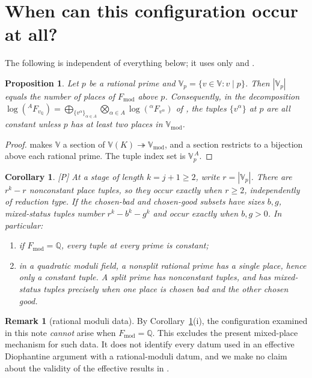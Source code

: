 \documentclass[11pt]{article}
\theoremstyle{plain}
\newtheorem{proposition}[theorem]{Proposition}
\newtheorem{corollary}[theorem]{Corollary}
\theoremstyle{definition}
\newtheorem{remark}{Remark}
\newcommand{\Fmod}{F_{\mathrm{mod}}}
\newcommand{\Vmod}{\mathbb{V}_{\mathrm{mod}}}
\newcommand{\VV}{\mathbb{V}}
\begin{document}
\section{When can this configuration occur at all?}\label{s:dich}

The following is independent of everything below; it uses only
\cite[Def.~3.1(e)]{IUT1} and \cite[Prop.~3.1]{IUT3}.

\begin{proposition}\label{p:dich}
Let $p$ be a rational prime and $\VV_p=\{v\in\VV: v\mid p\}$.  Then $|\VV_p|$
equals the number of places of $\Fmod$ above $p$.  Consequently, in the
decomposition
$\log({}^AF_{v_{\mathbb{Q}}})=\bigoplus_{\{v^\alpha\}_{\alpha\in A}}
\bigotimes_{\alpha\in A}\log({}^\alpha F_{v^\alpha})$ of \cite[Prop.~3.1]{IUT3},
the tuples $\{v^\alpha\}$ at $p$ are all constant unless $p$ has at least two
places in $\Vmod$.
\end{proposition}

\begin{proof}
\cite[Def.~3.1(e)]{IUT1} makes $\VV$ a section of
$\VV(K)\twoheadrightarrow\Vmod$, and a section restricts to a bijection above
each rational prime.  The tuple index set is $\VV_p^{\,A}$.
\end{proof}

\begin{corollary}\label{c:dich}
\textup{[P]} At a stage of length $k=j+1\ge2$, write $r=|\VV_p|$.
There are $r^k-r$ nonconstant place tuples, so they occur exactly when
$r\ge2$, independently of reduction type.  If the chosen-bad and
chosen-good subsets have sizes $b,g$, mixed-status tuples number
$r^k-b^k-g^k$ and occur exactly when $b,g>0$.  In particular:
\begin{enumerate}[label=(\roman*),itemsep=1pt]
\item if $\Fmod=\mathbb{Q}$, every tuple at every prime is constant;
\item in a quadratic moduli field, a nonsplit rational prime has a single
 place, hence only a constant tuple.  A split prime has nonconstant tuples,
 and has mixed-status tuples precisely when one place is chosen bad and
 the other chosen good.
\end{enumerate}
\end{corollary}

\begin{remark}[rational moduli data]
\label{r:Q}
By Corollary~\ref{c:dich}(i), the configuration examined in this note
\emph{cannot} arise when $\Fmod=\mathbb{Q}$.  This excludes the present
mixed-place mechanism for such data.  It does not identify every datum used
in an effective Diophantine argument with a rational-moduli datum, and we
make no claim about the validity of the effective results in \cite{MFHMP}.
\end{remark}
\end{document}
